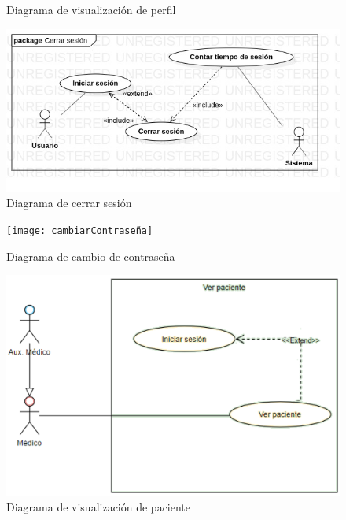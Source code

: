 \documentclass[12pt,letterpaper]{article}
\begin{document}
{\begin{figure}[H]
            \caption{Diagrama de visualización de perfil}
        \end{figure}
        \begin{figure}[H]
            \centering
            \includegraphics [scale=0.6]{cerrarSesion}
            \caption{Diagrama de cerrar sesión}
        \end{figure}
        \begin{figure}[H]
            \centering
            \texttt{[image: cambiarContraseña]}
            \caption{Diagrama de cambio de contraseña}
        \end{figure}
        \begin{figure}[H]
            \centering
            \includegraphics [scale=0.35]{verPaciente}
            \caption{Diagrama de visualización de paciente}
        \end{figure}
        
        \newpage
}
\end{document}
